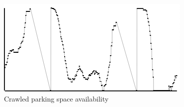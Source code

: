 \begin{figure}
  \centering
  \caption{Crawled parking space availability}
  \label{fig:actual}
  \includegraphics[scale=0.5]{fig_actual}
\end{figure}
